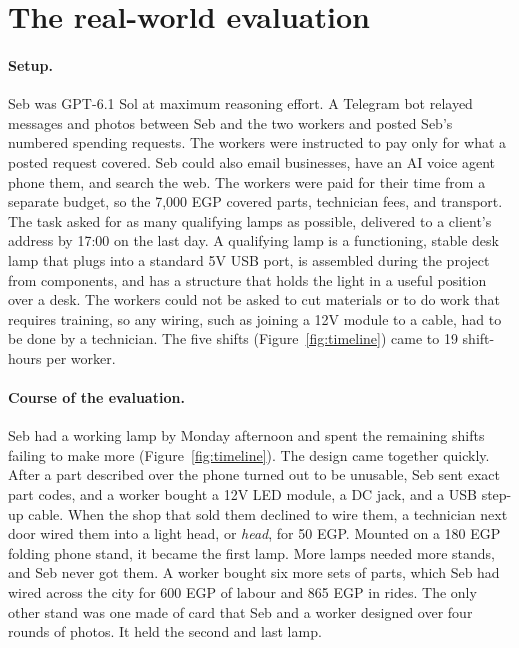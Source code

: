 \documentclass[10pt]{article}
\begin{document}
\section{The real-world evaluation}
\label{sec:real}

\paragraph{Setup.} Seb was GPT-6.1 Sol at maximum reasoning effort. A Telegram bot relayed
messages and photos between Seb and the two workers and posted Seb's numbered spending requests. The workers were instructed to pay only for what a posted request covered.
Seb could also email businesses, have an AI voice agent phone them, and search the web. The workers were paid for their time from a separate budget, so the 7,000 EGP covered parts, technician fees, and transport. The task asked for as many qualifying lamps as possible, delivered to a client's address by 17:00 on the last day. A qualifying lamp is a functioning, stable desk lamp that plugs into a standard 5V USB port, is
assembled during the project from components, and has a structure that holds the light in a
useful position over a desk. The workers could not be asked to cut materials or to do work that requires training, so any wiring, such as joining a 12V module to a cable, had to be done by a technician. The five shifts (Figure~\ref{fig:timeline}) came to 19 shift-hours per worker.

\paragraph{Course of the evaluation.} Seb had a working lamp by Monday afternoon and spent the remaining shifts failing to make more (Figure~\ref{fig:timeline}). The design came together quickly. After a part described over the phone turned out to be unusable, Seb sent exact part codes, and a worker bought a 12V LED module, a DC jack, and a USB step-up cable. When the shop that sold them declined to wire them, a technician next door wired them into a light head, or \emph{head}, for 50 EGP. Mounted on a 180 EGP folding phone stand, it became the first lamp. More lamps needed more stands, and Seb never got them. A worker bought six more sets of parts, which Seb had wired across the city for 600 EGP of labour and 865 EGP in rides. The only other stand was one made of card that Seb and a worker designed over four rounds of photos. It held the second and last lamp.
\end{document}
